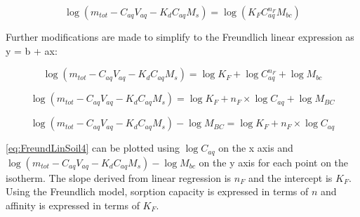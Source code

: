 \begin{equation} \label{eq:FreundLinSoil1}
   \log (m_{tot} - C_{aq}V_{aq} - K_dC_{aq}M_s) = \log (K_{F}C_{aq}^{n_F}M_{bc})
\end{equation}

Further modifications are made to simplify to the Freundlich linear expression as y = b + ax:

\begin{equation} \label{eq:FreundLinSoil2}
    \log (m_{tot} - C_{aq}V_{aq} - K_dC_{aq}M_s) = \log K_{F} + \log C_{aq}^{n_F} + \log M_{bc}
\end{equation}

\begin{equation} \label{eq:FreundLinSoil3}
    \log (m_{tot} - C_{aq}V_{aq} - K_dC_{aq}M_s) = \log K_{F} + n_F \times \log C_{aq} + \log M_{BC}
\end{equation}

\begin{equation} \label{eq:FreundLinSoil4}
    \log (m_{tot} - C_{aq}V_{aq} - K_dC_{aq}M_s) - \log M_{BC} = \log K_{F} + n_F \times \log C_{aq}  
\end{equation}

\cref{eq:FreundLinSoil4} can be plotted using $\log C_{aq}$ on the x axis and $\log (m_{tot} - C_{aq}V_{aq} - K_dC_{aq}M_s) - \log M_{bc}$ on the y axis for each point on the isotherm. The slope derived from linear regression is $n_F$ and the intercept is $K_F$. Using the Freundlich model, sorption capacity is expressed in terms of \(n\) and affinity is expressed in terms of \(K_F\). 

